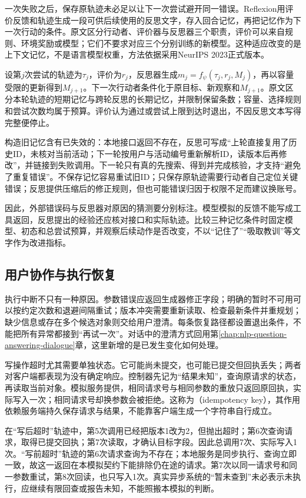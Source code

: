 一次失败之后，保存原轨迹未必足以让下一次尝试避开同一错误。Reflexion用评价反馈和轨迹生成一段可供后续使用的反思文字，存入回合记忆，再把记忆作为下一次行动的条件。原文区分行动者、评价器与反思器三个职责，评价可以来自规则、环境奖励或模型；它们不要求对应三个分别训练的新模型。这种适应改变的是上下文记忆，不是语言模型权重，方法依据采用NeurIPS 2023正式版本。

设第$j$次尝试的轨迹为$\tau_j$，评价为$r_j$，反思器生成$m_j=f_{\psi}(\tau_j,r_j,M_j)$，再以容量受限的更新得到$M_{j+1}$。下一次行动者条件化于原目标、新观察和$M_{j+1}$。原文区分本轮轨迹的短期记忆与跨轮反思的长期记忆，并限制保留条数；容量、选择规则和尝试次数均属于预算。评价认为通过或尝试上限到达时退出，不因反思文本写得完整便停止。

构造旧记忆含有已失效的：本地接口返回不存在，反思可写成“上轮直接复用了历史ID，未核对当前活动；下一轮按用户与活动编号重新解析ID，读版本后再修改”，并链接到失败调用。下一轮只有真的先搜索、得到并完成核验，才支持“避免了重复错误”。不保存记忆容易重试旧ID；只保存原轨迹需要行动者自己定位关键错误；反思提供压缩后的修正规则，但也可能错误归因于权限不足而建议换账号。

因此，外部错误码与反思器对原因的猜测要分别标注。模型模拟的反馈不能写成工具返回，反思提出的经验还应核对接口和实际轨迹。比较三种记忆条件时固定模型、初态和总尝试预算，并观察后续动作是否改变，不以“记住了”“吸取教训”等文字作为改进指标。

\subsection{用户协作与执行恢复}
\label{sec:nlp-execution-recovery}

执行中断不只有一种原因。参数错误应返回生成器修正字段；明确的暂时不可用可以按约定次数和退避间隔重试；版本冲突需要重新读取、检查最新条件并重规划；缺少信息或存在多个候选对象则交给用户澄清。每条恢复路径都设置退出条件，不能把所有异常都接到“再试一次”。对话中的澄清方式回用第\ref{chap:nlp-question-answering-dialogue}章，这里新增的是已发生变化如何处理。

写操作超时尤其需要单独状态。它可能尚未提交，也可能已提交但回执丢失；两者对客户端都表现为没有确定响应。控制器先记为“结果未知”，查询原请求的状态，再读取当前对象。模拟服务提供，相同请求号与相同参数的重放只返回原回执，实际写入一次；相同请求号却换参数会被拒绝。这称为（idempotency key），其作用依赖服务端持久保存请求与结果，不能靠客户端生成一个字符串自行成立。

在“写后超时”轨迹中，第5次调用已经把版本1改为2，但抛出超时；第6次查询请求，取得已提交回执；第7次读取，才确认目标字段。因此总调用7次、实际写入1次。“写前超时”轨迹的第6次请求查询为不存在；本地服务是同步执行、查询立即一致，故这一返回在本模拟契约下能排除仍在途的请求。第7次以同一请求号和同一参数重试，第8次回读，也只写入1次。真实异步系统的“暂未查到”未必表示未执行，应继续有限回查或报告未知，不能照搬本模拟的判断。

